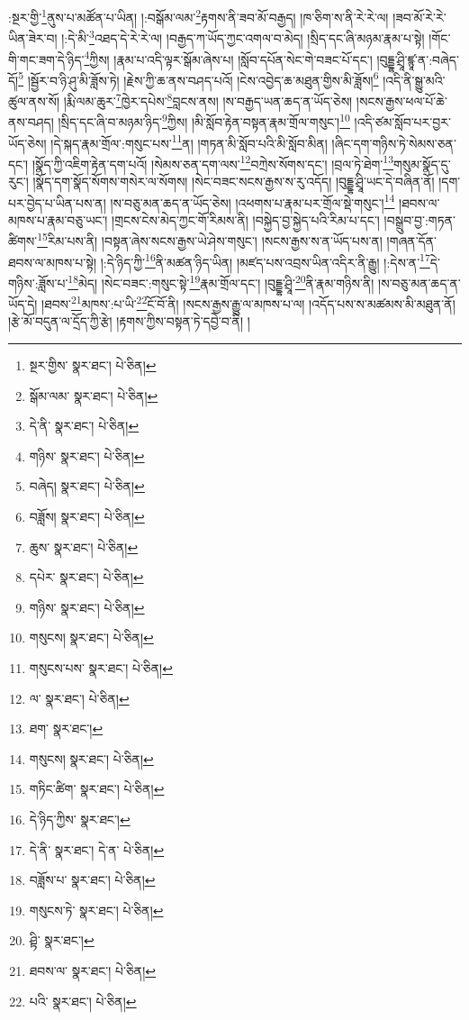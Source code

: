 :སྔར་གྱི་\footnote{སྔར་གྱིས་  སྣར་ཐང་།  པེ་ཅིན། }ནུས་པ་མཚོན་པ་ཡིན། །:བསྒོམ་ལམ་\footnote{སྒོམ་ལམ་  སྣར་ཐང་།  པེ་ཅིན། }རྟགས་ནི་ཟབ་མོ་བརྒྱད། །ཁ་ཅིག་ས་ནི་རེ་རེ་ལ། །ཟབ་མོ་རེ་རེ་ཡིན་ཟེར་བ། །:དེ་མི་\footnote{དེ་ནི་  སྣར་ཐང་།  པེ་ཅིན། }འཐད་དེ་རེ་རེ་ལ། །བརྒྱད་ཀ་ཡོད་ཀྱང་འགལ་བ་མེད། །སྲིད་དང་ཞི་མཉམ་རྣམ་པ་སྟེ། །གོང་གི་གང་ཟག་དེ་ཉིད་\footnote{གཉིས་  སྣར་ཐང་།  པེ་ཅིན། }ཀྱིས། །རྣམ་པ་འདི་ལྟར་སྒོམ་ཞེས་པ། །སློབ་དཔོན་སེང་གེ་བཟང་པོ་དང་། །བུདྡྷ་ཤྲཱི་ཛྙཱ་ན་:བཞེད་དོ།\footnote{བཞེད།  སྣར་ཐང་།  པེ་ཅིན། } །སྦྱོར་བ་ཉི་ཤུ་མི་ཟློས་ཏེ། །རྗེས་ཀྱི་ཆ་ནས་བཤད་པའོ། །ངེས་འབྱེད་ཆ་མཐུན་གྱིས་མི་ཟློས།\footnote{བཟློས།  སྣར་ཐང་།  པེ་ཅིན། } །འདི་ནི་སྒྱུ་མའི་ཚུལ་ནས་སོ། །རྨི་ལམ་ཆུར་\footnote{ཆུས་  སྣར་ཐང་།  པེ་ཅིན། }ཁྱེར་དཔེས་\footnote{དཔེར་  སྣར་ཐང་།  པེ་ཅིན། }བླངས་ནས། །ས་བརྒྱད་ཡན་ཆད་ན་ཡོད་ཅེས། །སངས་རྒྱས་ཕལ་པོ་ཆེ་ནས་བཤད། །སྲིད་དང་ཞི་བ་མཉམ་ཉིད་\footnote{གཉིས་  སྣར་ཐང་།  པེ་ཅིན། }ཀྱིས། །མི་སློབ་རྟེན་བསྟན་རྣམ་གྲོལ་གསུང་།\footnote{གསུངས།  སྣར་ཐང་།  པེ་ཅིན། } །འདི་ཙམ་སློབ་པར་བྱར་ཡོད་ཅེས། །དེ་སྐད་རྣམ་གྲོལ་:གསུང་པས་\footnote{གསུངས་པས་  སྣར་ཐང་།  པེ་ཅིན། }ན། །གཏན་མི་སློབ་པའི་མི་སློབ་མིན། །ཞིང་དག་གཉིས་ཏེ་སེམས་ཅན་དང་། །སྣོད་ཀྱི་འཇིག་རྟེན་དག་པའོ། །སེམས་ཅན་དག་ལས་\footnote{ལ་  སྣར་ཐང་།  པེ་ཅིན། }བཀྲེས་སོགས་དང་། །བྲལ་ཏེ་ཐེག་\footnote{ཐག་  སྣར་ཐང་། }གསུམ་སྣོད་དུ་རུང་། །སྣོད་དག་སྣོད་སོགས་གསེར་ལ་སོགས། །སེང་བཟང་སངས་རྒྱས་ས་རུ་འདོད། །བུདྡྷ་ཤྲཱི་ཡང་དེ་བཞིན་ནོ། །དག་པར་བྱེད་པ་ཡིན་པས་ན། །ས་བཅུ་མན་ཆད་ན་ཡོད་ཅེས། །འཕགས་པ་རྣམ་པར་གྲོལ་སྡེ་གསུང་།\footnote{གསུངས།  སྣར་ཐང་།  པེ་ཅིན། } །ཐབས་ལ་མཁས་པ་རྣམ་བཅུ་ཡང་། །གྲངས་ངེས་མེད་ཀྱང་གོ་རིམས་ནི། །བསྐྱེད་བྱ་སྐྱེད་པའི་རིམ་པ་དང་། །བསྒྲུབ་བྱ་:གཏན་ཚིགས་\footnote{གཏིང་ཚིག་  སྣར་ཐང་།  པེ་ཅིན། }རིམ་པས་ནི། །བསྟན་ཞེས་སངས་རྒྱས་ཡེ་ཤེས་གསུང་། །སངས་རྒྱས་ས་ན་ཡོད་པས་ན། །གཞན་དོན་ཐབས་ལ་མཁས་པ་སྟེ། །:དེ་ཉིད་ཀྱི་\footnote{དེ་ཉིད་ཀྱིས་  སྣར་ཐང་། }ནི་མཚན་ཉིད་ཡིན། །མཛད་པས་འབྲས་ཡིན་འདིར་ནི་རྒྱུ། །:དེས་ན་\footnote{དེ་ནི་  སྣར་ཐང་། དེ་ན་  པེ་ཅིན། }དེ་གཉིས་:ཟློས་པ་\footnote{བཟློས་པ་  སྣར་ཐང་།  པེ་ཅིན། }མེད། །སེང་བཟང་:གསུང་སྟེ་\footnote{གསུངས་ཏེ་  སྣར་ཐང་།  པེ་ཅིན། }རྣམ་གྲོལ་དང་། །བུདྡྷ་ཤྲཱི་\footnote{ཤྟི་  སྣར་ཐང་། }ནི་རྣམ་གཉིས་ནི། །ས་བཅུ་མན་ཆད་ན་ཡོད་དེ། །ཐབས་\footnote{ཐབས་ལ་  སྣར་ཐང་།  པེ་ཅིན། }མཁས་:པ་ཡི་\footnote{པའི་  སྣར་ཐང་།  པེ་ཅིན། }ངོ་བོ་ནི། །སངས་རྒྱས་རྒྱུ་ལ་མཁས་པ་ལ། །འདོད་པས་ས་མཚམས་མི་མཐུན་ནོ། །རྩེ་མོ་བདུན་ལ་དྲོད་ཀྱི་རྩེ། །རྟགས་ཀྱིས་བསྟན་ཏེ་དབྱེ་བ་ནི། །
